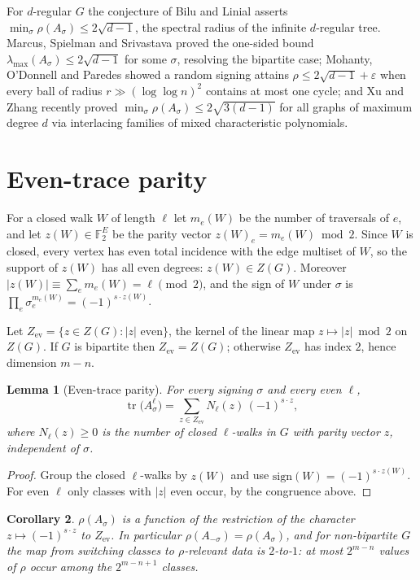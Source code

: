 \documentclass[11pt]{article}
\newtheorem{lemma}{Lemma}
\newtheorem{corollary}[lemma]{Corollary}
\theoremstyle{remark}
\newcommand{\F}{\mathbb{F}}
\newcommand{\Ze}{Z_{\mathrm{ev}}}
\newcommand{\rhomax}{\rho}
\DeclareMathOperator{\tr}{tr}
\begin{document}
For $d$-regular $G$ the conjecture of Bilu and Linial
\cite{bilulinial06} asserts $\min_\sigma\rhomax(A_\sigma)\le
2\sqrt{d-1}$, the spectral radius of the infinite $d$-regular tree.
Marcus, Spielman and Srivastava \cite{mss15} proved the one-sided bound
$\lambda_{\max}(A_\sigma)\le2\sqrt{d-1}$ for some $\sigma$, resolving the
bipartite case; Mohanty, O'Donnell and Paredes \cite{mop20} showed a
random signing attains $\rhomax\le2\sqrt{d-1}+\varepsilon$ when every
ball of radius $r\gg(\log\log n)^2$ contains at most one cycle; and Xu
and Zhang \cite{xuzhang26} recently proved
$\min_\sigma\rhomax(A_\sigma)\le2\sqrt{3(d-1)}$ for all graphs of maximum
degree $d$ via interlacing families of mixed characteristic polynomials.

\section{Even-trace parity}

For a closed walk $W$ of length $\ell$ let $m_e(W)$ be the number of
traversals of $e$, and let $z(W)\in\F_2^E$ be the parity vector
$z(W)_e=m_e(W)\bmod 2$. Since $W$ is closed, every vertex has even total
incidence with the edge multiset of $W$, so the support of $z(W)$ has all
even degrees: $z(W)\in Z(G)$. Moreover
$|z(W)|\equiv\sum_e m_e(W)=\ell\pmod 2$, and the sign of $W$ under
$\sigma$ is $\prod_e\sigma_e^{m_e(W)}=(-1)^{s\cdot z(W)}$.

Let $\Ze=\{z\in Z(G):|z|\text{ even}\}$, the kernel of the linear map
$z\mapsto|z|\bmod2$ on $Z(G)$. If $G$ is bipartite then $\Ze=Z(G)$;
otherwise $\Ze$ has index $2$, hence dimension $m-n$.

\begin{lemma}[Even-trace parity]\label{lem:parity}
For every signing $\sigma$ and every even $\ell$,
\[
\tr\!\big(A_\sigma^{\ell}\big)
=\sum_{z\in \Ze} N_\ell(z)\,(-1)^{s\cdot z},
\]
where $N_\ell(z)\ge0$ is the number of closed $\ell$-walks in $G$ with
parity vector $z$, independent of $\sigma$.
\end{lemma}

\begin{proof}
Group the closed $\ell$-walks by $z(W)$ and use
$\mathrm{sign}(W)=(-1)^{s\cdot z(W)}$. For even $\ell$ only classes with
$|z|$ even occur, by the congruence above.
\end{proof}

\begin{corollary}\label{cor:evenchar}
$\rhomax(A_\sigma)$ is a function of the restriction of the character
$z\mapsto(-1)^{s\cdot z}$ to $\Ze$. In particular
$\rhomax(A_{-\sigma})=\rhomax(A_\sigma)$, and for non-bipartite $G$ the
map from switching classes to $\rhomax$-relevant data is $2$-to-$1$: at
most $2^{m-n}$ values of $\rhomax$ occur among the $2^{m-n+1}$ classes.
\end{corollary}
\end{document}
